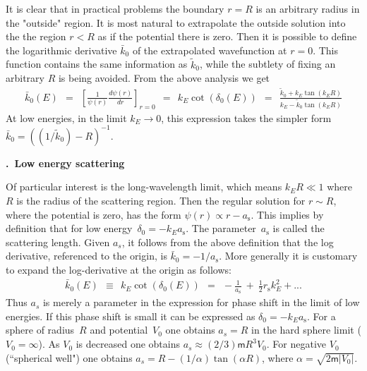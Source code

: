 \documentclass[onecolumn,fleqn, 11pt]{revtex4}
\newcommand{\mass}{\mathsf{m}}
\newcommand{\tbox}[1]{\text{#1}}
\newcommand{\beq}{\begin{eqnarray}}
\newcommand{\eeq}{\end{eqnarray}}
\renewcommand{\thesubsection}{\arabic{subsection}}
\renewcommand{\thesubsubsection}{\arabic{subsubsection}}
\newcommand{\sheadC}[1]
{
\addtocounter{subsubsection}{1}
\vspace{5mm}
{\bf \thesubsection.\thesubsubsection \ #1}  
\nopagebreak
\phantomsection
}
\begin{document}
It is clear that in practical problems  
the boundary ${r=R}$ is an arbitrary radius 
in the "outside" region. It is most natural 
to extrapolate the outside solution into the 
the region ${r<R}$ as if the potential there is zero. 
Then it is possible to define the logarithmic 
derivative $\bar{k}_0$ of the extrapolated 
wavefunction at ${r=0}$. This function contains 
the same information as $\tilde{k}_0$, 
while the subtlety of fixing an arbitrary $R$ 
is being avoided.  From the above analysis we get
\beq
\bar{k}_0(E) 
\ \ = \ \ \left[\frac{1}{\psi(r)}\frac{d\psi(r)}{dr}\right]_{r=0}
\ \ = \ \ k_E\cot(\delta_0(E)) 
\ \ = \ \ \frac{\tilde{k}_{0}+k_E\tan(k_ER)}{k_E-\tilde{k}_{0}\tan(k_ER)}
\eeq 
At low energies, in the limit $k_E\rightarrow 0$, 
this expression takes the simpler form ${\bar{k}_0=((1/\tilde{k}_0)-R)^{-1}}$. 



\sheadC{Low energy scattering}

Of particular interest is the long-wavelength limit, 
which means ${k_ER \ll 1}$ where $R$ is the radius 
of the scattering region. Then the regular solution 
for ${r \sim R}$, where the potential is zero,   
has the form ${\psi(r)\propto r-a_{\tbox{s}}}$.
This implies by definition that for low energy~${\delta_0=-k_Ea_{\tbox{s}}}$.  
The parameter~$a_{\tbox{s}}$ is called the scattering length. 
Given $a_s$, it follows from the above definition 
that the log derivative, referenced to the origin, 
is ${\bar{k}_0=-1/a_{\tbox{s}}}$. 
More generally it is customary to expand  
the log-derivative at the origin as follows:  
\beq
\bar{k}_0(E) \ \ \equiv \ \ k_E\cot(\delta_0(E)) 
\ \ = \ \ -\frac{1}{a_{\tbox{s}}} \ + \ \frac{1}{2}r_{\tbox{s}} k_E^2 + ...
\eeq
Thus $a_s$ is merely a parameter in the expression 
for phase shift in the limit of low energies. 
If this phase shift is small it can be  
expressed as ${\delta_0=-k_Ea_{\tbox{s}}}$.
For a sphere of radius~$R$ and potential~$V_0$
one obtains ${a_s = R}$ in the hard sphere limit (${V_0=\infty}$).
As $V_0$ is decreased one obtains ${a_s \approx (2/3)\mass R^3 V_0 }$.
For negative $V_0$ (``spherical well") one obtains ${a_s=R-(1/\alpha)\tan(\alpha R)}$, 
where ${\alpha=\sqrt{2\mass |V_0|}}$. 
\end{document}
